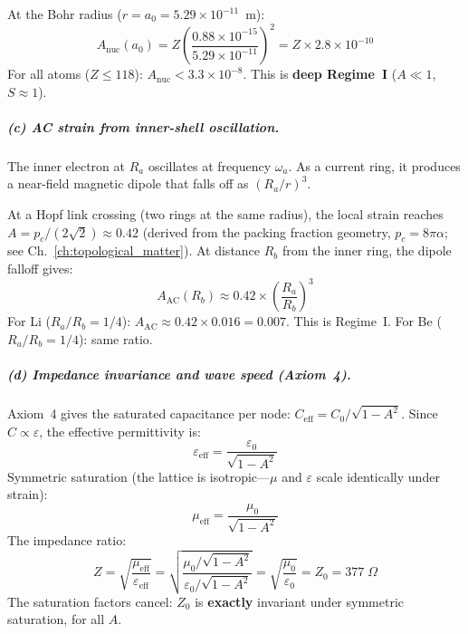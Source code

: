 At the Bohr radius ($r = a_0 = 5.29 \times 10^{-11}$~m):
\begin{equation}
    A_{\text{nuc}}(a_0)
    = Z\!\left(\frac{0.88\times 10^{-15}}
    {5.29\times 10^{-11}}\right)^{\!2}
    = Z \times 2.8 \times 10^{-10}
\end{equation}
For all atoms ($Z \leq 118$):
$A_{\text{nuc}} < 3.3 \times 10^{-8}$.
This is \textbf{deep Regime~I}
($A \ll 1$, $S \approx 1$).

\subparagraph{(c) AC strain from inner-shell oscillation.}
The inner electron at $R_a$ oscillates at frequency $\omega_a$.
As a current ring, it produces a near-field magnetic
dipole that falls off as $(R_a / r)^3$.

At a Hopf link crossing (two rings at the same radius),
the local strain reaches $A = p_c / (2\sqrt{2}) \approx 0.42$
(derived from the packing fraction geometry, $p_c = 8\pi\alpha$;
see Ch.~\ref{ch:topological_matter}).
At distance $R_b$ from the inner ring, the dipole falloff gives:
\begin{equation}
    A_{\text{AC}}(R_b) \approx 0.42
    \times \left(\frac{R_a}{R_b}\right)^{\!3}
    \label{eq:A_ac_dipole}
\end{equation}
For Li ($R_a/R_b = 1/4$):
$A_{\text{AC}} \approx 0.42 \times 0.016 = 0.007$.
This is Regime~I.  For Be ($R_a/R_b = 1/4$): same ratio.

\subparagraph{(d) Impedance invariance and wave speed (Axiom~4).}
Axiom~4 gives the saturated capacitance per node:
$C_{\text{eff}} = C_0 / \sqrt{1 - A^2}$.
Since $C \propto \varepsilon$, the effective permittivity is:
\begin{equation}
    \varepsilon_{\text{eff}}
    = \frac{\varepsilon_0}{\sqrt{1 - A^2}}
\end{equation}
Symmetric saturation (the lattice is isotropic---$\mu$ and
$\varepsilon$ scale identically under strain):
\begin{equation}
    \mu_{\text{eff}}
    = \frac{\mu_0}{\sqrt{1 - A^2}}
\end{equation}
The impedance ratio:
\begin{equation}
    Z = \sqrt{\frac{\mu_{\text{eff}}}{\varepsilon_{\text{eff}}}}
    = \sqrt{\frac{\mu_0 / \sqrt{1-A^2}}
    {\varepsilon_0 / \sqrt{1-A^2}}}
    = \sqrt{\frac{\mu_0}{\varepsilon_0}}
    = Z_0 = 377\;\Omega
    \label{eq:Z0_invariant}
\end{equation}
The saturation factors cancel: $Z_0$ is \textbf{exactly}
invariant under symmetric saturation, for all $A$.

